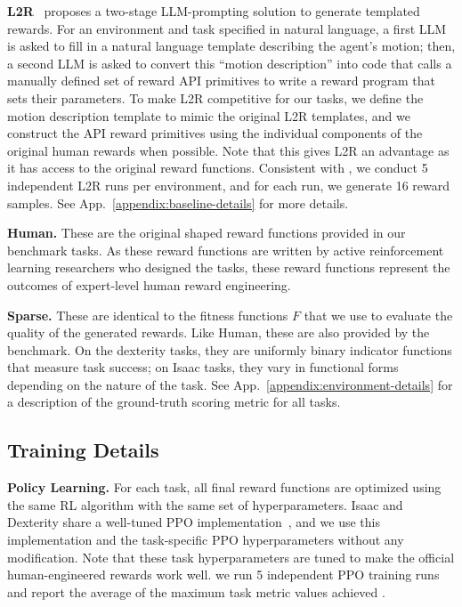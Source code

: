 \textbf{L2R}~\citep{yu2023language} proposes a two-stage LLM-prompting solution to generate templated rewards. For an environment and task specified in natural language, a first LLM is asked to fill in a natural language template describing the agent's motion; then, a second LLM is asked to convert this ``motion description'' into code that calls a manually defined set of reward API primitives to write a reward program that sets their parameters. To make L2R competitive for our tasks, we define the motion description template to mimic the original L2R templates, and we construct the API reward primitives using the individual components of the original human rewards when possible. Note that this gives L2R an advantage as it has access to the original reward functions. Consistent with \ourmethod, we conduct 5 independent L2R runs per environment, and for each run, we generate 16 reward samples. See App.~\ref{appendix:baseline-details} for more details.


\textbf{Human.} These are the original shaped reward functions provided in our benchmark tasks. As these reward functions are written by active reinforcement learning researchers who designed the tasks, these reward functions represent the outcomes of expert-level human reward engineering.

\textbf{Sparse.} These are identical to the fitness functions $F$ that we use to evaluate the quality of the generated rewards. Like Human, these are also provided by the benchmark. On the dexterity tasks, they are uniformly binary indicator functions that measure task success; on Isaac tasks, they vary in functional forms depending on the nature of the task. See App.~\ref{appendix:environment-details} for a description of the ground-truth scoring metric for all tasks. 

\subsection{Training Details}
\textbf{Policy Learning.} For each task, all final reward functions are optimized using the same RL algorithm with the same set of hyperparameters. Isaac and Dexterity share a well-tuned PPO implementation~\citep{schulman2017proximal, rl-games2021}, and we use this implementation and the task-specific PPO hyperparameters without any modification. Note that these task hyperparameters are tuned to make the official human-engineered rewards work well.  we run 5 independent PPO training runs and report the average of the maximum task metric values achieved . 



